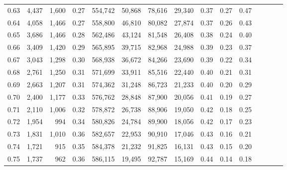 \begin{tabular}{rrrcrrrrrrrrrrr}
0.63 &   4,437 &  1,600 &                                       0.27 &  554,742 &   50,868 &   78,616 &   29,340 &  0.37 &  0.27 &                         0.47 \\
0.64 &   4,058 &  1,466 &                                       0.27 &  558,800 &   46,810 &   80,082 &   27,874 &  0.37 &  0.26 &                         0.43 \\
0.65 &   3,686 &  1,466 &                                       0.28 &  562,486 &   43,124 &   81,548 &   26,408 &  0.38 &  0.24 &                         0.40 \\
0.66 &   3,409 &  1,420 &                                       0.29 &  565,895 &   39,715 &   82,968 &   24,988 &  0.39 &  0.23 &                         0.37 \\
0.67 &   3,043 &  1,298 &                                       0.30 &  568,938 &   36,672 &   84,266 &   23,690 &  0.39 &  0.22 &                         0.34 \\
0.68 &   2,761 &  1,250 &                                       0.31 &  571,699 &   33,911 &   85,516 &   22,440 &  0.40 &  0.21 &                         0.31 \\
0.69 &   2,663 &  1,207 &                                       0.31 &  574,362 &   31,248 &   86,723 &   21,233 &  0.40 &  0.20 &                         0.29 \\
0.70 &   2,400 &  1,177 &                                       0.33 &  576,762 &   28,848 &   87,900 &   20,056 &  0.41 &  0.19 &                         0.27 \\
0.71 &   2,110 &  1,006 &                                       0.32 &  578,872 &   26,738 &   88,906 &   19,050 &  0.42 &  0.18 &                         0.25 \\
0.72 &   1,954 &    994 &                                       0.34 &  580,826 &   24,784 &   89,900 &   18,056 &  0.42 &  0.17 &                         0.23 \\
0.73 &   1,831 &  1,010 &                                       0.36 &  582,657 &   22,953 &   90,910 &   17,046 &  0.43 &  0.16 &                         0.21 \\
0.74 &   1,721 &    915 &                                       0.35 &  584,378 &   21,232 &   91,825 &   16,131 &  0.43 &  0.15 &                         0.20 \\
0.75 &   1,737 &    962 &                                       0.36 &  586,115 &   19,495 &   92,787 &   15,169 &  0.44 &  0.14 &                         0.18 \\

\end{tabular}
